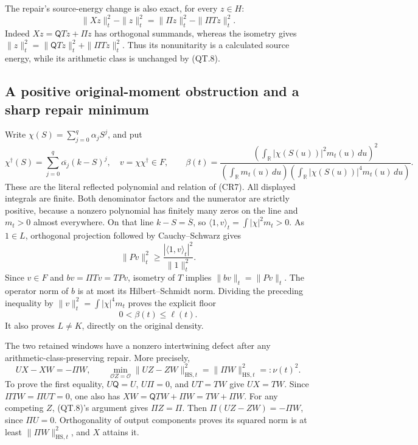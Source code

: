 The repair's source-energy change is also exact, for every \(z\in H\):
\[
 \|Xz\|_t^2-\|z\|_t^2
       =\|\Pi z\|_t^2-\|\Pi Tz\|_t^2.
 \tag{QT.14}\label{CFStage:eq:qt-energy}
\]
Indeed \(Xz=\mathsf QTz+\Pi z\) has orthogonal summands, whereas
the isometry gives
\(\|z\|_t^2=\|\mathsf QTz\|_t^2+\|\Pi Tz\|_t^2\).
Thus its nonunitarity is a calculated source energy, while its
arithmetic class is unchanged by (QT.8).

\subsection{A positive original-moment obstruction and a sharp repair minimum}

Write \(\chi(S)=\sum_{j=0}^q\alpha_jS^j\), and put
\[
 \chi^\dagger(S)=\sum_{j=0}^q\overline{\alpha_j}(k-S)^j,\quad
 v=\chi\chi^\dagger\in F,\qquad
 \beta(t)=
 \frac{\left(\int_{\mathbb R}|\chi(S(u))|^2m_t(u)\,du\right)^2}
 {\left(\int_{\mathbb R}m_t(u)\,du\right)
  \left(\int_{\mathbb R}|\chi(S(u))|^4m_t(u)\,du\right)}.
 \tag{QT.15}\label{CFStage:eq:qt-momentfloor}
\]
These are the literal reflected polynomial and relation of (CR7).
All displayed integrals are finite. Both denominator factors and
the numerator are strictly positive, because a nonzero polynomial
has finitely many zeros on the line and \(m_t>0\) almost everywhere.
On that line \(k-S=\overline S\), so
\(\langle1,v\rangle_t=\int|\chi|^2m_t>0\).
As \(1\in L\), orthogonal projection followed by Cauchy--Schwarz gives
\[
 \|Pv\|_t^2\ge
       \frac{|\langle1,v\rangle_t|^2}{\|1\|_t^2}.
 \]
Since \(v\in F\) and \(bv=\Pi Tv=TPv\), isometry of \(T\) implies
\(\|bv\|_t=\|Pv\|_t\).
The operator norm of \(b\) is at most its Hilbert--Schmidt norm.
Dividing the preceding inequality by
\(\|v\|_t^2=\int|\chi|^4m_t\) proves the explicit floor
\[
 0<\beta(t)\le\ell(t).
 \tag{QT.16}\label{CFStage:eq:qt-positive}
\]
It also proves \(L\ne K\), directly on the original density.

The two retained windows have a nonzero intertwining defect after
any arithmetic-class-preserving repair. More precisely,
\[
 UX-XW=-\Pi W,\qquad
 \min_{\mathcal OZ=\mathcal O}\|UZ-ZW\|_{\mathrm{HS},t}^2
       =\|\Pi W\|_{\mathrm{HS},t}^2
       =:\nu(t)^2.
 \tag{QT.17}\label{CFStage:eq:qt-minimum}
\]
To prove the first equality, \(U\mathsf Q=U\), \(U\Pi=0\), and
\(UT=TW\) give \(UX=TW\).
Since \(\Pi TW=\Pi UT=0\), one also has
\(XW=\mathsf QTW+\Pi W=TW+\Pi W\).
For any competing \(Z\), (QT.8)'s argument gives \(\Pi Z=\Pi\).
Then
\(\Pi(UZ-ZW)=-\Pi W\), since \(\Pi U=0\).
Orthogonality of output components proves its squared norm is at
least \(\|\Pi W\|_{\mathrm{HS},t}^2\), and \(X\) attains it.

